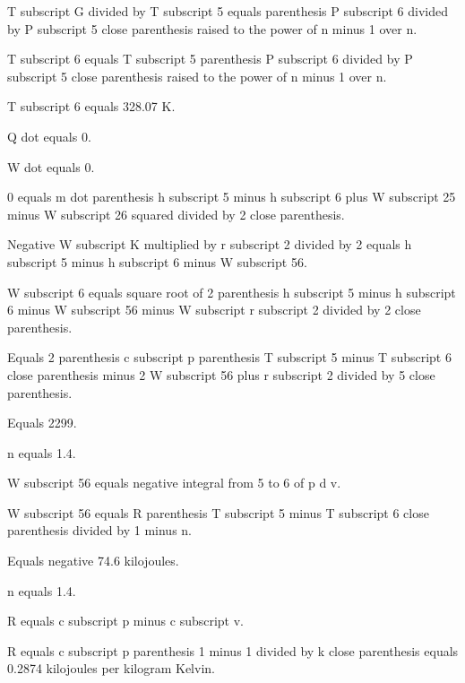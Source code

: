T subscript G divided by T subscript 5 equals parenthesis P subscript 6 divided by P subscript 5 close parenthesis raised to the power of n minus 1 over n.

T subscript 6 equals T subscript 5 parenthesis P subscript 6 divided by P subscript 5 close parenthesis raised to the power of n minus 1 over n.

T subscript 6 equals 328.07 K.

Q dot equals 0.

W dot equals 0.

0 equals m dot parenthesis h subscript 5 minus h subscript 6 plus W subscript 25 minus W subscript 26 squared divided by 2 close parenthesis.

Negative W subscript K multiplied by r subscript 2 divided by 2 equals h subscript 5 minus h subscript 6 minus W subscript 56.

W subscript 6 equals square root of 2 parenthesis h subscript 5 minus h subscript 6 minus W subscript 56 minus W subscript r subscript 2 divided by 2 close parenthesis.

Equals 2 parenthesis c subscript p parenthesis T subscript 5 minus T subscript 6 close parenthesis minus 2 W subscript 56 plus r subscript 2 divided by 5 close parenthesis.

Equals 2299.

n equals 1.4.

W subscript 56 equals negative integral from 5 to 6 of p d v.

W subscript 56 equals R parenthesis T subscript 5 minus T subscript 6 close parenthesis divided by 1 minus n.

Equals negative 74.6 kilojoules.

n equals 1.4.

R equals c subscript p minus c subscript v.

R equals c subscript p parenthesis 1 minus 1 divided by k close parenthesis equals 0.2874 kilojoules per kilogram Kelvin.